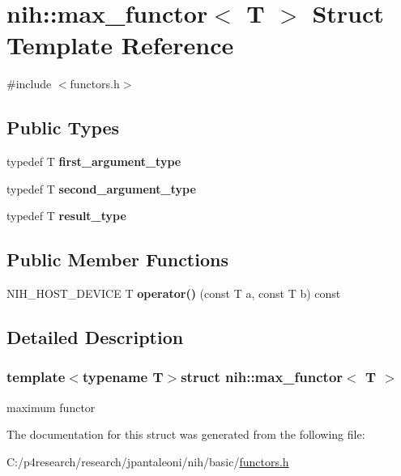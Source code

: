 \hypertarget{structnih_1_1max__functor}{
\section{nih\-:\-:max\-\_\-functor$<$ \-T $>$ \-Struct \-Template \-Reference}
\label{structnih_1_1max__functor}
}


{\ttfamily \#include $<$functors.\-h$>$}

\subsection*{\-Public \-Types}
\begin{DoxyCompactItemize}
\item 
\hypertarget{structnih_1_1max__functor_a92d715a24d4757bac951e3b38a0b85df}{
typedef \-T {\bfseries first\-\_\-argument\-\_\-type}}
\label{structnih_1_1max__functor_a92d715a24d4757bac951e3b38a0b85df}

\item 
\hypertarget{structnih_1_1max__functor_adb029bd6c9a2a73aeac260efe039d4ed}{
typedef \-T {\bfseries second\-\_\-argument\-\_\-type}}
\label{structnih_1_1max__functor_adb029bd6c9a2a73aeac260efe039d4ed}

\item 
\hypertarget{structnih_1_1max__functor_a53529f344dda32c9a1d3b7224137726b}{
typedef \-T {\bfseries result\-\_\-type}}
\label{structnih_1_1max__functor_a53529f344dda32c9a1d3b7224137726b}

\end{DoxyCompactItemize}
\subsection*{\-Public \-Member \-Functions}
\begin{DoxyCompactItemize}
\item 
\hypertarget{structnih_1_1max__functor_a7582c9543009b7180d04f82410c448d8}{
\-N\-I\-H\-\_\-\-H\-O\-S\-T\-\_\-\-D\-E\-V\-I\-C\-E \-T {\bfseries operator()} (const \-T a, const \-T b) const }
\label{structnih_1_1max__functor_a7582c9543009b7180d04f82410c448d8}

\end{DoxyCompactItemize}


\subsection{\-Detailed \-Description}
\subsubsection*{template$<$typename T$>$struct nih\-::max\-\_\-functor$<$ T $>$}

maximum functor 

\-The documentation for this struct was generated from the following file\-:\begin{DoxyCompactItemize}
\item 
\-C\-:/p4research/research/jpantaleoni/nih/basic/\hyperlink{functors_8h}{functors.\-h}\end{DoxyCompactItemize}
